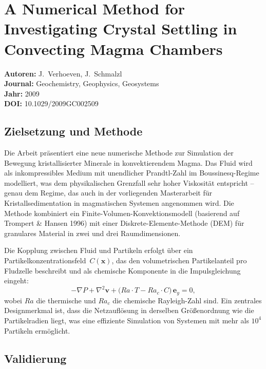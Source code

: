 \documentclass[a4paper,12pt]{article}
\begin{document}
\section*{A Numerical Method for Investigating Crystal Settling in Convecting Magma Chambers}

\noindent\textbf{Autoren:} J.~Verhoeven, J.~Schmalzl \\
\textbf{Journal:} Geochemistry, Geophysics, Geosystems \\
\textbf{Jahr:} 2009 \\
\textbf{DOI:} 10.1029/2009GC002509

\subsection*{Zielsetzung und Methode}

Die Arbeit pr\"asentiert eine neue numerische Methode zur Simulation der
Bewegung kristallisierter Minerale in konvektierendem Magma. Das Fluid wird
als inkompressibles Medium mit unendlicher Prandtl-Zahl im Boussinesq-Regime
modelliert, was dem physikalischen Grenzfall sehr hoher Viskosit\"at entspricht
-- genau dem Regime, das auch in der vorliegenden Masterarbeit f\"ur
Kristallsedimentation in magmatischen Systemen angenommen wird. Die Methode
kombiniert ein Finite-Volumen-Konvektionsmodell (basierend auf Trompert
\& Hansen 1996) mit einer Diskrete-Elemente-Methode (DEM) f\"ur granulares
Material in zwei und drei Raumdimensionen.

Die Kopplung zwischen Fluid und Partikeln erfolgt \"uber ein Partikelkonzentrationsfeld~$C(\mathbf{x})$, das den volumetrischen Partikelanteil pro Fludzelle beschreibt und als chemische Komponente in die Impulsgleichung eingeht:
\begin{equation}
    -\nabla P + \nabla^2 \mathbf{v} + \bigl(Ra \cdot T - Ra_c \cdot C\bigr)\,\mathbf{e}_y = 0,
\end{equation}
wobei $Ra$ die thermische und $Ra_c$ die chemische Rayleigh-Zahl sind. Ein
zentrales Designmerkmal ist, dass die Netzaufl\"osung in derselben
Gr\"o{\ss}enordnung wie die Partikelradien liegt, was eine effiziente
Simulation von Systemen mit mehr als $10^4$ Partikeln erm\"oglicht.

\subsection*{Validierung}
\end{document}
